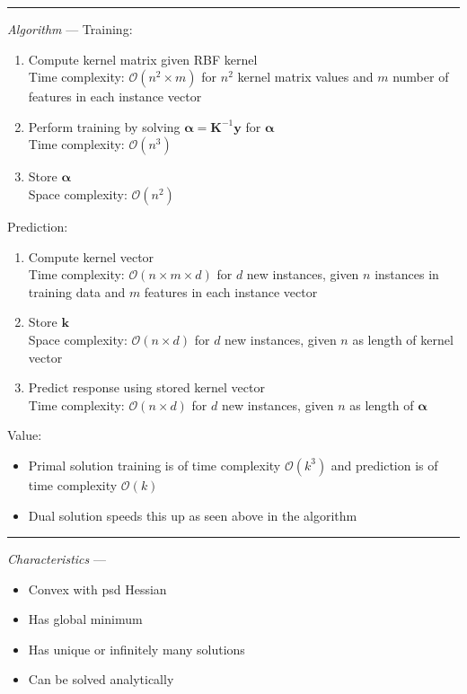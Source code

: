 {\color{lightgray}\hrule height 0.001mm}

\emph{Algorithm} --- 
Training:
\begin{enumerate}
    \item Compute kernel matrix given RBF kernel\\
    Time complexity: $\mathcal{O}(n^2 \times m)$ for $n^2$ kernel matrix values and $m$ number of features in each instance vector
    \item Perform training by solving $\boldsymbol{\alpha} = \boldsymbol{K}^{-1} \boldsymbol{y}$ for $\boldsymbol{\alpha}$\\
    Time complexity: $\mathcal{O}(n^3)$ 
    \item Store $\boldsymbol{\alpha}$\\
    Space complexity: $\mathcal{O}(n^2)$ 
\end{enumerate}
Prediction:
\begin{enumerate}
    \item Compute kernel vector\\
    Time complexity: $\mathcal{O}(n \times m \times d)$ for $d$ new instances, given $n$ instances in training data and $m$ features in each instance vector
    \item Store $\boldsymbol{k}$\\
    Space complexity: $\mathcal{O}(n \times d)$ for $d$ new instances, given $n$ as length of kernel vector
    \item Predict response using stored kernel vector\\
    Time complexity: $\mathcal{O}(n \times d)$ for $d$ new instances, given $n$ as length of $\boldsymbol{\alpha}$
\end{enumerate}
Value:
\begin{itemize}
    \item Primal solution training is of time complexity $\mathcal{O}(k^3)$ and prediction is of time complexity $\mathcal{O}(k)$
    \item Dual solution speeds this up as seen above in the algorithm
\end{itemize}

{\color{lightgray}\hrule height 0.001mm}

\emph{Characteristics} --- 
\begin{itemize}
    \item Convex with psd Hessian
    \item Has global minimum
    \item Has unique or infinitely many solutions
    \item Can be solved analytically 
\end{itemize}